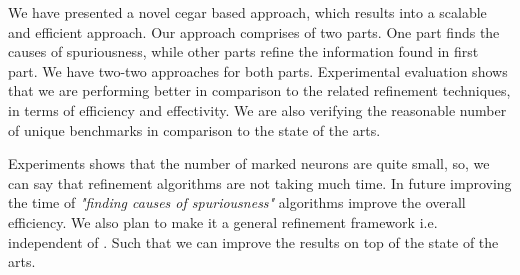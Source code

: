 We have presented a novel cegar based approach, which results into a scalable and efficient approach. 
Our approach comprises of two parts. One part finds the causes of spuriousness, while other parts refine 
the information found in first part. We have two-two approaches for both parts. 
Experimental evaluation shows that we are performing better in comparison to the related refinement techniques, 
in terms of efficiency and effectivity. We are also verifying the reasonable number of unique benchmarks
in comparison to the state of the arts. 

Experiments shows that the number of marked neurons are quite small, so, 
we can say that refinement algorithms are not taking much time.
In future improving the time of {\em "finding causes of spuriousness"} algorithms improve the overall efficiency.    
We also plan to make it a general refinement framework i.e. independent of \deeppoly{}. Such that 
we can improve the results on top of the state of the arts.  
